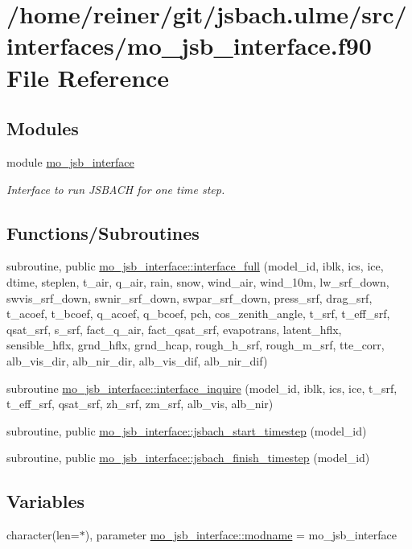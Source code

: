 \hypertarget{mo__jsb__interface_8f90}{}\section{/home/reiner/git/jsbach.ulme/src/interfaces/mo\+\_\+jsb\+\_\+interface.f90 File Reference}
\label{mo__jsb__interface_8f90}
\subsection*{Modules}
\begin{DoxyCompactItemize}
\item 
module \hyperlink{namespacemo__jsb__interface}{mo\+\_\+jsb\+\_\+interface}
\begin{DoxyCompactList}\small\item\em Interface to run J\+S\+B\+A\+C\+H for one time step. \end{DoxyCompactList}\end{DoxyCompactItemize}
\subsection*{Functions/\+Subroutines}
\begin{DoxyCompactItemize}
\item 
subroutine, public \hyperlink{namespacemo__jsb__interface_a669b978bf786a78426b4aa57d8c8f7b1}{mo\+\_\+jsb\+\_\+interface\+::interface\+\_\+full} (model\+\_\+id, iblk, ics, ice, dtime, steplen, t\+\_\+air, q\+\_\+air, rain, snow, wind\+\_\+air, wind\+\_\+10m, lw\+\_\+srf\+\_\+down, swvis\+\_\+srf\+\_\+down, swnir\+\_\+srf\+\_\+down, swpar\+\_\+srf\+\_\+down, press\+\_\+srf, drag\+\_\+srf, t\+\_\+acoef, t\+\_\+bcoef, q\+\_\+acoef, q\+\_\+bcoef, pch, cos\+\_\+zenith\+\_\+angle, t\+\_\+srf, t\+\_\+eff\+\_\+srf, qsat\+\_\+srf, s\+\_\+srf, fact\+\_\+q\+\_\+air, fact\+\_\+qsat\+\_\+srf, evapotrans, latent\+\_\+hflx, sensible\+\_\+hflx, grnd\+\_\+hflx, grnd\+\_\+hcap, rough\+\_\+h\+\_\+srf, rough\+\_\+m\+\_\+srf, tte\+\_\+corr, alb\+\_\+vis\+\_\+dir, alb\+\_\+nir\+\_\+dir, alb\+\_\+vis\+\_\+dif, alb\+\_\+nir\+\_\+dif)
\item 
subroutine \hyperlink{namespacemo__jsb__interface_a250055ad69ba018faf24c0ddf07a8f11}{mo\+\_\+jsb\+\_\+interface\+::interface\+\_\+inquire} (model\+\_\+id, iblk, ics, ice, t\+\_\+srf, t\+\_\+eff\+\_\+srf, qsat\+\_\+srf, zh\+\_\+srf, zm\+\_\+srf, alb\+\_\+vis, alb\+\_\+nir)
\item 
subroutine, public \hyperlink{namespacemo__jsb__interface_adc4527f7e9aae89da0fc1b77a7df3bb8}{mo\+\_\+jsb\+\_\+interface\+::jsbach\+\_\+start\+\_\+timestep} (model\+\_\+id)
\item 
subroutine, public \hyperlink{namespacemo__jsb__interface_a95c35cbcc6ae136bb45b71fa2a944bf5}{mo\+\_\+jsb\+\_\+interface\+::jsbach\+\_\+finish\+\_\+timestep} (model\+\_\+id)
\end{DoxyCompactItemize}
\subsection*{Variables}
\begin{DoxyCompactItemize}
\item 
character(len=$\ast$), parameter \hyperlink{namespacemo__jsb__interface_a4b120a12931c3fa9318b7a3421f3e919}{mo\+\_\+jsb\+\_\+interface\+::modname} = \textquotesingle{}mo\+\_\+jsb\+\_\+interface\textquotesingle{}
\end{DoxyCompactItemize}
